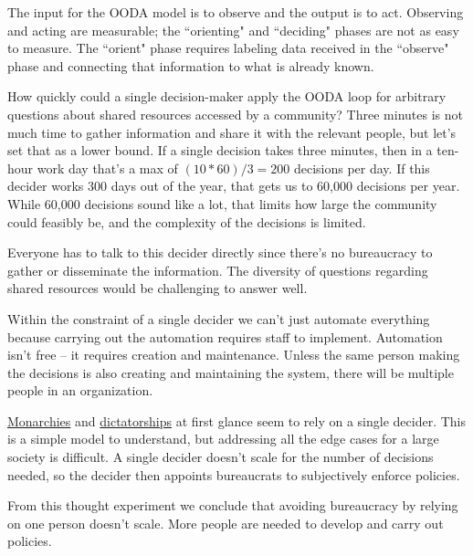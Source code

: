 The input for the OODA model is to observe and the output is to act. Observing and acting are measurable; the ``orienting" and ``deciding" phases are not as easy to measure. The ``orient" phase requires labeling data received in the ``observe" phase and connecting that information to what is already known.

How quickly could a single decision-maker apply the OODA loop for arbitrary questions about \glspl{shared resource} accessed by a community? Three minutes is not much time to gather information and share it with the relevant people, but let's set that as a lower bound.
If a single decision takes three minutes, then in a ten-hour work day that's a max of $(10*60)/3 = 200$ decisions per day. If this decider works 300 days out of the year, that gets us to 60,000 decisions per year. While 60,000 decisions sound like a lot, that limits how large the community could feasibly be, and the complexity of the decisions is limited. 

Everyone has to talk to this decider directly since there's no bureaucracy to gather or disseminate the information. The diversity of questions regarding shared resources would be challenging to answer well.

Within the constraint of a single decider we can't just automate everything because carrying out the automation requires staff to implement. 
Automation isn't free -- it requires creation and maintenance. Unless the same person making the decisions is also creating and maintaining the system, there will be multiple people in an organization.


\href{https://en.wikipedia.org/wiki/Monarchy}{Monarchies} 
and 
\href{https://en.wikipedia.org/wiki/Dictator}{dictatorships}
at first glance seem to rely on a single decider. This is a simple model to understand, but addressing all the edge cases for a large society is difficult. A single decider doesn't scale for the number of decisions needed, so the decider then appoints bureaucrats to subjectively enforce policies. 

From this thought experiment we conclude that avoiding bureaucracy by relying on one person doesn't scale. More people are needed to develop and carry out policies. 




